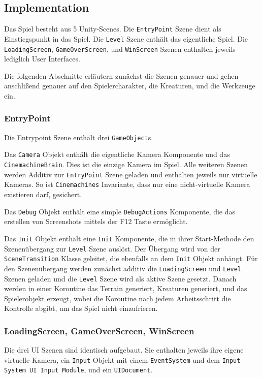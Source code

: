  
\subsection{Implementation}
Das Spiel besteht aus 5 Unity-Scenes.
Die \texttt{EntryPoint} Szene dient als Einstiegspunkt in das Spiel.
Die \texttt{Level} Szene enthält das eigentliche Spiel.
Die \texttt{LoadingScreen}, \texttt{GameOverScreen}, und \texttt{WinScreen} Szenen enthalten jeweils lediglich User Interfaces.

Die folgenden Abschnitte erläutern zunächst die Szenen genauer und gehen anschlißend genauer auf den Spielercharakter, die Kreaturen, und die Werkzeuge ein.

\subsubsection{EntryPoint}
Die Entrypoint Szene enthält drei \texttt{GameObject}s.

Das \texttt{Camera} Objekt enthält die eigentliche Kamera Komponente und das \texttt{CinemachineBrain}.
Dies ist die einzige Kamera im Spiel.
Alle weiteren Szenen werden Additiv zur \texttt{EntryPoint} Szene geladen und enthalten jeweils nur virtuelle Kameras.
So ist \texttt{Cinemachines} Invariante, dass nur eine nicht-virtuelle Kamera existieren darf, gesichert.

Das \texttt{Debug} Objekt enthält eine simple \texttt{DebugActions} Komponente, die das erstellen von Screenshots mittels der F12 Taste ermöglicht.

Das \texttt{Init} Objekt enthält eine \texttt{Init} Komponente, die in ihrer Start-Methode den Szenenübergang zur \texttt{Level} Szene auslöst.
Der Übergang wird von der \texttt{SceneTransition} Klasse geleitet, die ebenfalls an dem \texttt{Init} Objekt anhängt.
Für den Szenenübergang werden zunächst additiv die \texttt{LoadingScreen} und \texttt{Level} Szenen geladen und die \texttt{Level} Szene wird als aktive Szene gesetzt.
Danach werden in einer Koroutine das Terrain generiert, Kreaturen generiert, und das Spielerobjekt erzeugt, wobei die Koroutine nach jedem Arbeitsschritt die Kontrolle abgibt, um das Spiel nicht einzufrieren.

\subsubsection{LoadingScreen, GameOverScreen, WinScreen}
Die drei UI Szenen sind identisch aufgebaut.
Sie enthalten jeweils ihre eigene virtuelle Kamera, ein \texttt{Input} Objekt mit einem \texttt{EventSystem} und dem \texttt{Input System UI Input Module}, und ein \texttt{UIDocument}.


